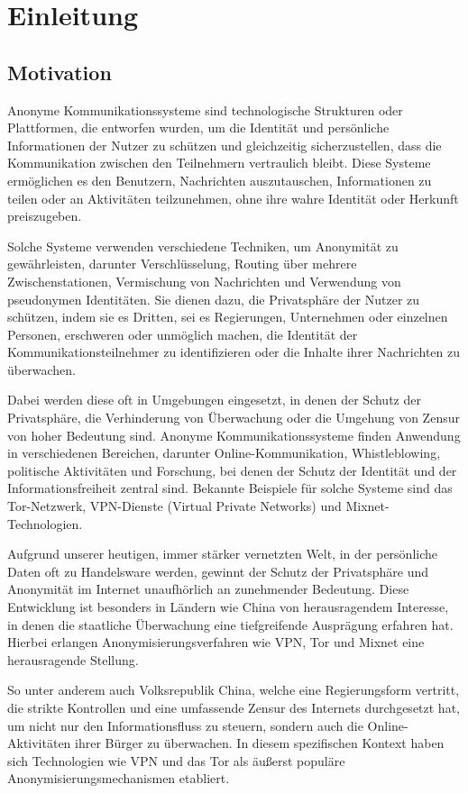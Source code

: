 \section{Einleitung}

\subsection{Motivation}

Anonyme Kommunikationssysteme sind technologische Strukturen oder Plattformen, die entworfen wurden, um die Identität und persönliche Informationen der Nutzer zu schützen und gleichzeitig sicherzustellen, dass die Kommunikation zwischen den Teilnehmern vertraulich bleibt. Diese Systeme ermöglichen es den Benutzern, Nachrichten auszutauschen, Informationen zu teilen oder an Aktivitäten teilzunehmen, ohne ihre wahre Identität oder Herkunft preiszugeben.

Solche Systeme verwenden verschiedene Techniken, um Anonymität zu gewährleisten, darunter Verschlüsselung, Routing über mehrere Zwischenstationen, Vermischung von Nachrichten und Verwendung von pseudonymen Identitäten. Sie dienen dazu, die Privatsphäre der Nutzer zu schützen, indem sie es Dritten, sei es Regierungen, Unternehmen oder einzelnen Personen, erschweren oder unmöglich machen, die Identität der Kommunikationsteilnehmer zu identifizieren oder die Inhalte ihrer Nachrichten zu überwachen.

Dabei werden diese oft in Umgebungen eingesetzt, in denen der Schutz der Privatsphäre, die Verhinderung von Überwachung oder die Umgehung von Zensur von hoher Bedeutung sind. Anonyme Kommunikationssysteme finden Anwendung in verschiedenen Bereichen, darunter Online-Kommunikation, Whistleblowing, politische Aktivitäten und Forschung, bei denen der Schutz der Identität und der Informationsfreiheit zentral sind. Bekannte Beispiele für solche Systeme sind das Tor-Netzwerk, VPN-Dienste (Virtual Private Networks) und Mixnet-Technologien.

Aufgrund unserer heutigen, immer stärker vernetzten Welt, in der persönliche Daten oft zu Handelsware werden, gewinnt der Schutz der Privatsphäre und Anonymität im Internet unaufhörlich an zunehmender Bedeutung. Diese Entwicklung ist besonders in Ländern wie China von herausragendem Interesse, in denen die staatliche Überwachung eine tiefgreifende Ausprägung erfahren hat. Hierbei erlangen Anonymisierungsverfahren wie VPN, Tor und Mixnet eine herausragende Stellung.

So unter anderem auch Volksrepublik China, welche eine Regierungsform vertritt, die strikte Kontrollen und eine umfassende Zensur des Internets durchgesetzt hat, um nicht nur den Informationsfluss zu steuern, sondern auch die Online-Aktivitäten ihrer Bürger zu überwachen. In diesem spezifischen Kontext haben sich Technologien wie VPN und das Tor als äußerst populäre Anonymisierungsmechanismen etabliert.

